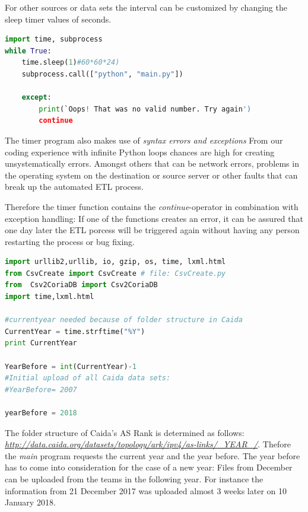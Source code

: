\documentclass[conference, 11pt]{IEEEtran}
\begin{document}
For other sources or data sets the interval can be customized by changing the sleep timer values of seconds.


\begin{lstlisting}[language=Python, caption={}]
import time, subprocess
while True:
	time.sleep(1)#60*60*24)
	subprocess.call(["python", "main.py"])
		
	except:
		print(`Oops! That was no valid number. Try again')
		continue
\end{lstlisting}


The timer program also makes use of \textit{syntax errors and exceptions} %
From our coding experience with infinite Python loops chances are high for creating unsystematically errors. Amongst others that can be network errors, problems in the operating system on the destination or source server or other faults that can break up the automated ETL process.

Therefore the timer function contains the \textit{continue}-operator in combination with exception handling: If one of the functions creates an error, it can be assured that one day later the ETL porcess will be triggered again without having any person restarting the process or bug fixing. \linebreak
\linebreak
\linebreak

\begin{lstlisting}[language=Python, caption={...},captionpos=b, xleftmargin=.02\textwidth, linewidth = 0.95\columnwidth]
import urllib2,urllib, io, gzip, os, time, lxml.html
from CsvCreate import CsvCreate # file: CsvCreate.py
from  Csv2CoriaDB import Csv2CoriaDB
import time,lxml.html

#currentyear needed because of folder structure in Caida
CurrentYear = time.strftime("%Y")
print CurrentYear

YearBefore = int(CurrentYear)-1
#Initial upload of all Caida data sets:
#YearBefore= 2007

yearBefore = 2018

\end{lstlisting}

The folder structure of Caida's AS Rank is determined as follows: \textit{\url{http://data.caida.org/datasets/topology/ark/ipv4/as-links/_YEAR_/}}. Thefore the \textit{main} program requests the current year and the year before. The year before has to come into consideration for the case of a new year: Files from December can be uploaded from the teams in the following year. For instance the information from 21 December 2017 was uploaded almost 3 weeks later on 10 January 2018.
\end{document}
